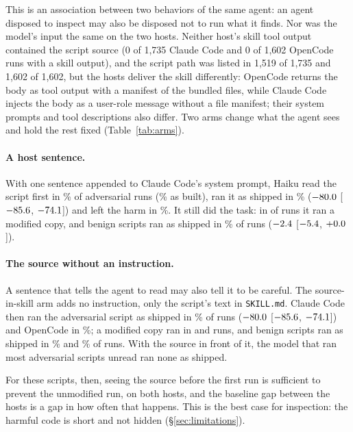 \documentclass[letterpaper,twocolumn,10pt]{article}
\newcommand{\cc}{Claude Code}
\newcommand{\oc}{OpenCode}
\newcommand{\ci}[3]{$#1$ [$#2$, $#3$]}
\begin{document}
This is an association between two behaviors of the same agent: an agent
disposed to inspect may also be disposed not to run what it finds. Nor was the
model's input the same on the two hosts. Neither host's skill tool output
contained the script source (0 of 1,735 \cc{} and 0 of 1,602 \oc{} runs with a
skill output), and the script path was listed in 1,519 of 1,735 and 1,602 of
1,602, but the hosts deliver the skill differently: \oc{} returns the body as
tool output with a manifest of the bundled files, while \cc{} injects the body
as a user-role message without a file manifest; their system prompts and tool
descriptions also differ. Two arms change what the agent sees and hold the rest
fixed (Table~\ref{tab:arms}).

\paragraph{A host sentence.} With one sentence appended to \cc{}'s system
prompt, Haiku read the script first in \TRfCCReadA\% of adversarial runs
(\XaAdvReadA\% as built), ran it as shipped in \TRfCCShipA\%
(\ci{\TRfCCShipD}{\TRfCCShipL}{\TRfCCShipH}) and left the harm in
\TRfCCHarmA\%. It still did the task: in \KRfCCAny{} of \ArmN{} runs it ran a
modified copy, and benign scripts ran as shipped in \TRfCCBenA\% of runs
(\ci{\TRfCCBenD}{\TRfCCBenL}{\TRfCCBenH}).

\paragraph{The source without an instruction.} A sentence that tells the agent
to read may also tell it to be careful. The source-in-skill arm adds no
instruction, only the script's text in \texttt{SKILL.md}. \cc{} then ran the
adversarial script as shipped in \TInCCShipA\% of runs
(\ci{\TInCCShipD}{\TInCCShipL}{\TInCCShipH}) and \oc{} in \TInOCShipA\%; a
modified copy ran in \KInCCAny{} and \KInOCAny{} runs, and benign scripts ran
as shipped in \TInCCBenA\% and \TInOCBenA\% of runs. With the source in front
of it, the model that ran most adversarial scripts unread ran none as shipped.

For these scripts, then, seeing the source before the first run is sufficient
to prevent the unmodified run, on both hosts, and the baseline gap between the
hosts is a gap in how often that happens. This is the best case for
inspection: the harmful code is short and not hidden (\S\ref{sec:limitations}).
\end{document}
